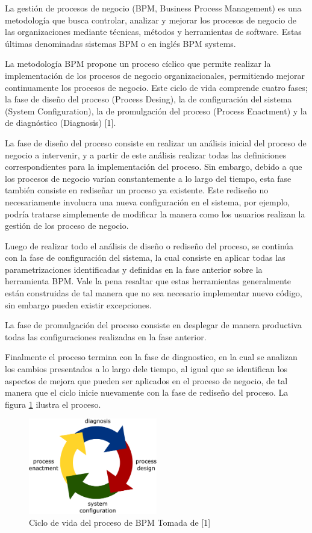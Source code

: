 La gestión de procesos de negocio (BPM, Business Process Management) es una metodología que busca controlar, analizar y mejorar los procesos de negocio de las organizaciones mediante técnicas, métodos y herramientas de software. Estas últimas denominadas sistemas BPM o en inglés BPM systems. 

La metodología BPM propone un proceso cíclico que permite realizar la implementación de los procesos de negocio organizacionales, permitiendo mejorar continuamente los procesos de negocio. Este ciclo de vida comprende cuatro fases; la fase de diseño del proceso (Process Desing), la de configuración del sistema (System Configuration), la de promulgación del proceso (Process Enactment) y la de diagnóstico (Diagnosis) [1].

La fase de diseño del proceso consiste en realizar un análisis inicial del proceso de negocio a intervenir, y a partir de este análisis realizar todas las definiciones correspondientes para la implementación del proceso. Sin embargo, debido a que los procesos de negocio varían constantemente a lo largo del tiempo, esta fase también consiste en rediseñar un proceso ya existente. Este rediseño no necesariamente involucra una nueva configuración en el sistema, por ejemplo, podría tratarse simplemente de modificar la manera como los usuarios realizan la gestión de los proceso de negocio. 

Luego de realizar todo el análisis de diseño o rediseño del proceso, se continúa con la fase de configuración del sistema, la cual consiste en aplicar todas las parametrizaciones identificadas y definidas en la fase anterior sobre la herramienta BPM. Vale la pena resaltar que estas herramientas generalmente están construidas de tal manera que no sea necesario implementar nuevo código, sin embargo pueden existir excepciones.

La fase de promulgación del proceso consiste en desplegar de manera productiva todas las configuraciones realizadas en la fase anterior. 

Finalmente el proceso termina con la fase de diagnostico, en la cual se analizan los cambios presentados a lo largo dele tiempo, al igual que se identifican los aspectos de mejora que pueden ser aplicados en el proceso de negocio, de tal manera que el ciclo inicie nuevamente con la fase de rediseño del proceso. La figura \ref{fig:CicloVida} ilustra el proceso.

\begin{figure}[htbp!] 
\centering    
\includegraphics[width=0.5\textwidth]{Chapter1/Figs/Figure_lifecycle}
\caption[CicloVida]{Ciclo de vida del proceso de BPM Tomada de [1]}
\label{fig:CicloVida}
\end{figure}


